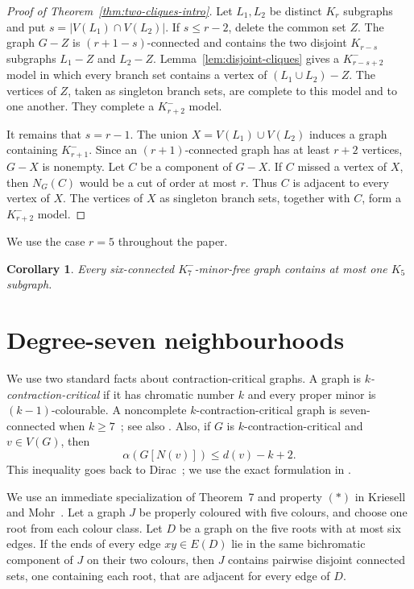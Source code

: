 \documentclass[11pt]{amsart}
\newtheorem{corollary}[theorem]{Corollary}
\newcommand{\N}{N}
\begin{document}
\begin{proof}[Proof of Theorem~\ref{thm:two-cliques-intro}]
Let $L_1,L_2$ be distinct $K_r$ subgraphs and put
$s=|V(L_1)\cap V(L_2)|$.  If $s\leq r-2$, delete the common set $Z$.
The graph $G-Z$ is $(r+1-s)$-connected and contains the two disjoint
$K_{r-s}$ subgraphs $L_1-Z$ and $L_2-Z$.  Lemma~\ref{lem:disjoint-cliques}
gives a $K_{r-s+2}^{-}$ model in which every branch set contains a vertex
of $(L_1\cup L_2)-Z$.  The vertices of $Z$, taken as singleton branch
sets, are complete to this model and to one another.  They complete a
$K_{r+2}^{-}$ model.

It remains that $s=r-1$.  The union $X=V(L_1)\cup V(L_2)$ induces a graph
containing $K_{r+1}^{-}$.  Since an $(r+1)$-connected graph has at least
$r+2$ vertices, $G-X$ is nonempty.  Let $C$ be a component of $G-X$.  If
$C$ missed a vertex of $X$, then $\N_G(C)$ would be a cut of order at most
$r$.  Thus $C$ is adjacent to every vertex of $X$.  The vertices of $X$
as singleton branch sets, together with $C$, form a $K_{r+2}^{-}$ model.
\end{proof}

We use the case $r=5$ throughout the paper.

\begin{corollary}\label{cor:unique-k5}
Every six-connected $K_7^{-}$-minor-free graph contains at most one $K_5$
subgraph.
\end{corollary}

\section{Degree-seven neighbourhoods}

We use two standard facts about contraction-critical graphs.  A graph is
\emph{$k$-contraction-critical} if it has chromatic number $k$ and every
proper minor is $(k-1)$-colourable.  A noncomplete
$k$-contraction-critical graph is seven-connected when
$k\geq7$~\cite[Satz~6]{Mader1968Connectivity}; see also
\cite[Theorem~1.8]{RolekSong2017}.  Also, if $G$ is $k$-contraction-critical
and $v\in V(G)$, then
\[
        \alpha(G[\N(v)])\leq d(v)-k+2.
                                                        \tag{3.1}
\]
This inequality goes back to Dirac~\cite{Dirac1960}; we use the exact
formulation in \cite[Lemma~1.6(i)]{RolekSong2017}.

We use an immediate specialization of Theorem~7 and property $(*)$ in
Kriesell and
Mohr~\cite[Theorem~7]{KriesellMohr2019}.  Let a graph $J$ be properly
coloured with five colours, and choose one root from each colour class.
Let $D$ be a graph on the five roots with at most six edges.  If the ends
of every edge $xy\in E(D)$ lie in the same bichromatic component of $J$
on their two colours, then $J$ contains pairwise disjoint connected sets,
one containing each root, that are adjacent for every edge of $D$.
\end{document}
